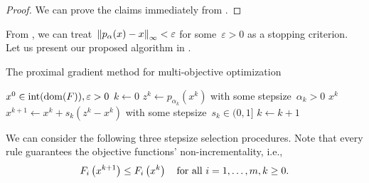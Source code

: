 \documentclass[../main]{subfiles}
\begin{document}
\begin{proof}
    We can prove the claims immediately from .
\end{proof}

From , we can treat~$\norm*{p_\alpha(x) - x}_\infty < \varepsilon$ for some~$\varepsilon > 0$ as a stopping criterion.
Let us present our proposed algorithm in .
\begin{algorithm}[hbtp]
    \caption{The proximal gradient method for multi-objective optimization}
    \begin{algorithmic}[1]
        \Require $x^0 \in \interior (\dom (F)), \varepsilon > 0$
        \State $k \gets 0$
        \Loop
        \State $z^k \gets p_{\alpha_k}\left(x^k\right)$ with some stepsize~$\alpha_k > 0$ 
        \State \Return $x^k$
        \EndIf
        \State $x^{k + 1} \gets x^k + s_k \left(z^k - x^k\right)$ with some stepsize~$s_k \in (0, 1]$ 
        \State $k \gets k + 1$
        \EndLoop
    \end{algorithmic}
\end{algorithm}
We can consider the following three stepsize selection procedures.
Note that every rule guarantees the objective functions' non-incrementality, i.e.,
\begin{equation} \label{eq:pgm_nonincrementality}
    F_i\left(x^{k + 1}\right) \le F_i\left(x^k\right) \forallcondition{i = 1, \dots, m, k \geq 0}
.\end{equation}
\end{document}
